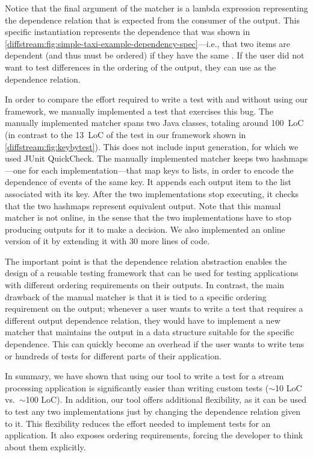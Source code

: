 Notice that the final argument of the matcher is a lambda expression
representing the dependence relation that is expected from the
consumer of the output. This specific instantiation represents the
dependence that was shown in \cref{diffstream:fig:simple-taxi-example-dependency-spec}---i.e., that two items are dependent (and thus must be ordered) if
they have the same . If the user did not want to test
differences in the ordering of the output, they can use
 as the dependence relation.


In order to compare the effort required to write a test with and
without using our framework, we manually implemented a test that
exercises this bug. The manually implemented matcher spans two Java
classes, totaling around 100~LoC (in contrast to the 13~LoC of the
test in our framework shown in \cref{diffstream:fig:keybytest}). This does not
include input generation, for which we used JUnit QuickCheck. The
manually implemented matcher keeps two hashmaps---one for each
implementation---that map keys to lists, in order to encode the
dependence of events of the same key. It appends each output item to
the list associated with its key. After the two implementations stop
executing, it checks that the two hashmaps represent equivalent
output. Note that this manual matcher is not online, in the sense that
the two implementations have to stop producing outputs for it to make
a decision. We also implemented an online version of it by extending
it with 30 more lines of code.

The important point is that the dependence relation abstraction
enables the design of a reusable testing framework that can be used
for testing applications with different ordering requirements on their
outputs. In contrast, the main drawback of the manual matcher is that
it is tied to a specific ordering requirement on the output; whenever
a user wants to write a test that requires a different output
dependence relation, they would have to implement a new matcher that
maintains the output in a data structure suitable for the specific
dependence. This can quickly become an overhead if the user wants to
write tens or hundreds of tests for different parts of their
application.

In summary, we have shown that using our tool to write a test for a stream processing application is significantly easier than writing custom tests ($\sim$10 LoC vs.~$\sim$100 LoC). In addition, our tool offers additional flexibility, as it can be used to test any two implementations just by changing the dependence relation given to it. This flexibility reduces the effort needed to implement tests for an application. It also exposes ordering requirements, forcing the developer to think about them explicitly.

